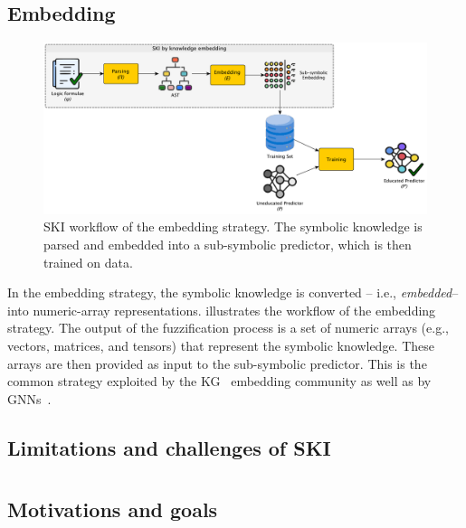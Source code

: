 \subsection{Embedding}\label{subsec:ski-embedding}
%
\begin{figure}
    \centering
    \includegraphics[width=.9\linewidth]{figures/workflow-embedding}
    \caption[SKI workflow of embedding strategy]{
        \gls{SKI} workflow of the embedding strategy.
        The symbolic knowledge is parsed and embedded into a sub-symbolic predictor, which is then trained on data.
    }
    \label{fig:workflow-embedding}
\end{figure}
%
In the embedding strategy, the symbolic knowledge is converted -- i.e., \emph{embedded}-- into numeric-array representations.
%
 illustrates the workflow of the embedding strategy.
%
The output of the fuzzification process is a set of numeric arrays (e.g., vectors, matrices, and tensors) that represent the symbolic knowledge.
%
These arrays are then provided as input to the sub-symbolic predictor.
%
This is the common strategy exploited by the \gls{KG}~\cite{DBLP:conf/ijcai/LambGGPAV20} embedding community as well as by \glspl{GNN}~\cite{DBLP:journals/tkde/WangMWG17}.


\subsection[Limitations and challenges of SKI]{Limitations and challenges of \Gls{SKI}}\label{subsec:limitations-and-challenges-of-ski}

\section[Symbolic knowledge extraction]{}\label{sec:ske}

\subsection{Motivations and goals}\label{subsec:ske-motivations-and-goals}

